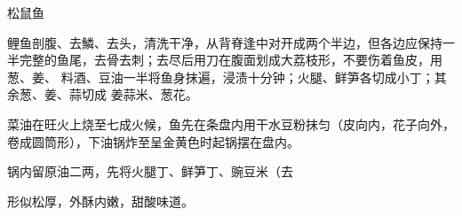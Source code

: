 \begin{recipe}{松鼠鱼}

\ingredients


\cooking

\step 鲤鱼剖腹、去鱗、去头，清洗干净，从背脊逢中对开成两个半边，但各边应保持一
半完整的鱼尾，去骨去刺；去尽后用刀在腹面划成大荔枝形，不要伤着鱼皮，用葱、姜、
料酒、豆油一半将鱼身抹遍，浸渍十分钟；火腿、鲜笋各切成小丁；其余葱、姜、蒜切成
姜蒜米、葱花。

\step 菜油在旺火上烧至七成火候，鱼先在条盘内用干水豆粉抹匀（皮向内，花子向外，
卷成圆筒形），下油锅炸至呈金黄色时起锅摆在盘内。

\step 锅内留原油二两，先将火腿丁、鲜笋丁、豌豆米（去

\notes

形似松厚，外酥内嫩，甜酸味道。

\end{recipe}

